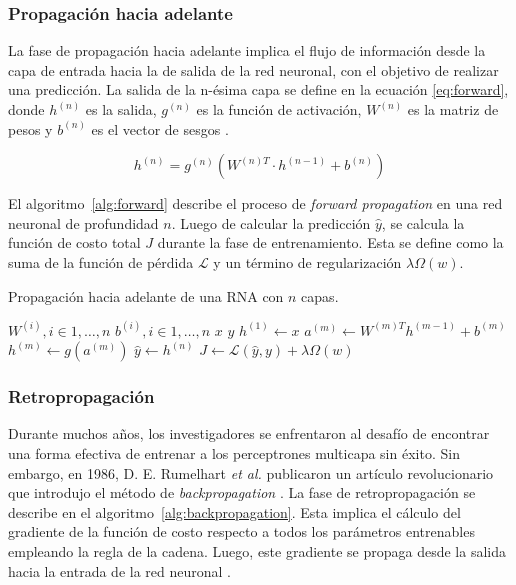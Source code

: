 \subsubsection{Propagación hacia adelante}
La fase de propagación hacia adelante implica el flujo de información desde la capa de entrada hacia la de 
salida de la red neuronal, con el objetivo de realizar una predicción. La salida de la n-ésima capa se 
define en la ecuación \ref{eq:forward}, donde $h^{(n)}$ es la salida, $g^{(n)}$ es la función de activación, $W^{(n)}$ 
es la matriz de pesos y $b^{(n)}$ es el vector de sesgos \citep{CITE:35} \citep{CITE:44}.

\begin{equation}
	\label{eq:forward}
	h^{(n)} = g^{(n)} (W^{(n)T} \cdot h^{(n-1)} + b^{(n)})
\end{equation}

El algoritmo~\ref{alg:forward} describe el proceso de \emph{forward propagation} en una red neuronal de profundidad $n$. 
Luego de calcular la predicción $\hat{y}$, se calcula la función de costo total $J$ durante la fase de entrenamiento. 
Esta se define como la suma de la función de pérdida $\mathcal{L}$ y un término de regularización $\lambda \Omega(w)$.

\begin{algorithm}
	\caption{Propagación hacia adelante de una RNA con $n$ capas.}
	\label{alg:forward}
	\begin{algorithmic}
		\Require $W^{(i)}, i \in 1, \ldots, n$ 
		\Require $b^{(i)}, i \in 1, \ldots, n$ 
		\Require $x$ 
		\Require $y$ 
		\State $h^{(1)} \gets x$
		\State $a^{(m)} \gets W^{(m)T}h^{(m-1)} + b^{(m)} $
		\State $h^{(m)} \gets g(a^{(m)})$
		\EndFor
		\State $\hat{y} \gets h^{(n)}$
		\State $J \gets \mathcal{L}(\hat{y}, y) + \lambda \Omega(w)$ 
	\end{algorithmic}
\end{algorithm}

\subsubsection{Retropropagación}

Durante muchos años, los investigadores se enfrentaron al desafío de encontrar una forma 
efectiva de entrenar a los perceptrones multicapa sin éxito. Sin embargo, en 1986, D. E. 
Rumelhart \emph{et al.} publicaron un artículo revolucionario que introdujo el método 
de \emph{backpropagation} \citep{CITE:47}. La fase de retropropagación se describe en el 
algoritmo~\ref{alg:backpropagation}. Esta implica el cálculo del gradiente de la función de 
costo respecto a todos los parámetros entrenables empleando la regla de la cadena. 
Luego, este gradiente se propaga desde la salida hacia la entrada de la red neuronal \citep{CITE:35} \citep{CITE:42} \citep{CITE:44}.

